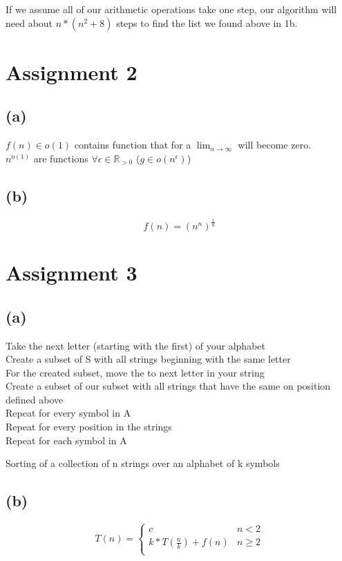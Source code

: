\documentclass[a4paper,12px]{article}
\begin{document}
If we assume all of our arithmetic operations take one step, our algorithm will
need about $n*(n^{2} + 8)$ steps to find the list we found above in 1b.

\section{Assignment 2}
\subsection{(a)}
$f(n) \in o(1)$ contains function that for a $\lim_{n \to \infty}$ will become
zero.\\
$n^{o(1)}$ are functions $\forall \epsilon \in \mathbb{R}_{>0}$ ($g
\in o(n^{\epsilon})$)

\subsection{(b)}
$$f(n) = (n^{n})^{\frac{1}{n}}$$

\section{Assignment 3}
\subsection{(a)}
\begin{algorithm}[H]
    \Indp
    Take the next letter (starting with the first) of your alphabet \\
    Create a subset of S with all strings beginning with the same letter \\
    \Indp
        For the created subset, move the to next letter in your string \\
        Create a subset of our subset with all strings that have the same on position defined above \\
        Repeat for every symbol in A \\
        Repeat for every position in the strings \\
    \Indm
    Repeat for each symbol in A \\
    \bigskip
    \caption{Sorting of a collection of n strings over an alphabet of k symbols}
\end{algorithm}

\subsection{(b)}
    $$T(n) =
        \left\{
            \begin{array}{ll}
                c & n < 2  \\
                k*T(\frac{n}{k}) + f(n) &  n \geq 2 \\
            \end{array}
        \right.$$
\end{document}
